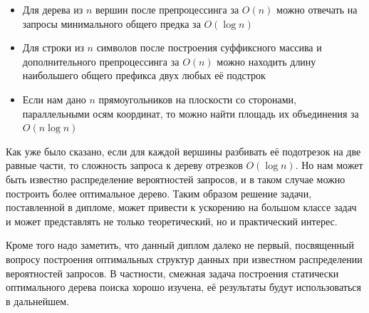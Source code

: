 \begin{itemize}
    \item Для дерева из $n$ вершин после препроцессинга за $O(n)$ можно отвечать на запросы минимального общего предка за $O(\log n)$
    \item Для строки из $n$ символов после построения суффиксного массива и дополнительного препроцессинга за $O(n)$ можно находить длину наибольшего общего префикса двух любых её подстрок
    \item Если нам дано $n$ прямоугольников на плоскости со сторонами, параллельными осям координат, то можно найти площадь их объединения за $O(n \log n)$
\end{itemize}

Как уже было сказано, если для каждой вершины разбивать её подотрезок на две равные части, то сложность запроса к дереву отрезков $O(\log n)$. Но нам может быть известно распределение вероятностей запросов, и в таком случае можно построить более оптимальное дерево. Таким образом решение задачи, поставленной в дипломе, может привести к ускорению на большом классе задач и может представлять не только теоретический, но и практический интерес.

Кроме того надо заметить, что данный диплом далеко не первый, посвященный вопросу построения оптимальных структур данных при известном распределении вероятностей запросов. В частности, смежная задача построения статически оптимального дерева поиска хорошо изучена, её результаты будут использоваться в дальнейшем.